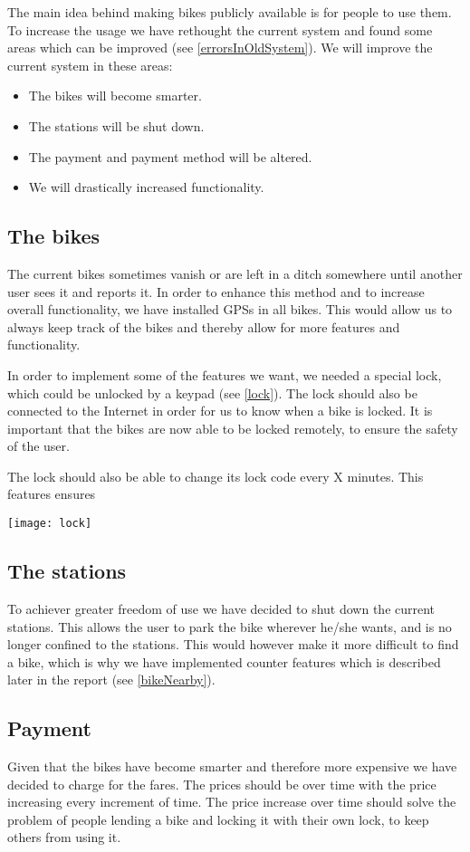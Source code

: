 The main idea behind making bikes publicly available is for people to use them. To increase the usage we have rethought the current system and found some areas which can be improved (see \ref{errorsInOldSystem}).
We will improve the current system in these areas:
\begin{itemize}
\item The bikes will become smarter.
\item The stations will be shut down.
\item The payment and payment method will be altered.
\item We will drastically increased functionality.
\end{itemize}

\subsection{The bikes}
The current bikes sometimes vanish or are left in a ditch somewhere until another user sees it and reports it. In order to enhance this method and to increase overall functionality, we have installed GPSs in all bikes. This would allow us to always keep track of the bikes and thereby allow for more features and functionality.

In order to implement some of the features we want, we needed a special lock, which could be unlocked by a keypad (see \ref{lock}). The lock should also be connected to the Internet in order for us to know when a bike is locked. It is important that the bikes are now able to be locked remotely, to ensure the safety of the user.

The lock should also be able to change its lock code every X minutes. This features ensures 

\texttt{[image: lock]}

\subsection{The stations}
To achiever greater freedom of use we have decided to shut down the current stations. This allows the user to park the bike wherever he/she wants, and is no longer confined to the stations. This would however make it more difficult to find a bike, which is why we have implemented counter features which is described later in the report (see \ref{bikeNearby}).

\subsection{Payment}
Given that the bikes have become smarter and therefore more expensive we have decided to charge for the fares. The prices should be over time with the price increasing every increment of time.
The price increase over time should solve the problem of people lending a bike and locking it with their own lock, to keep others from using it. 

